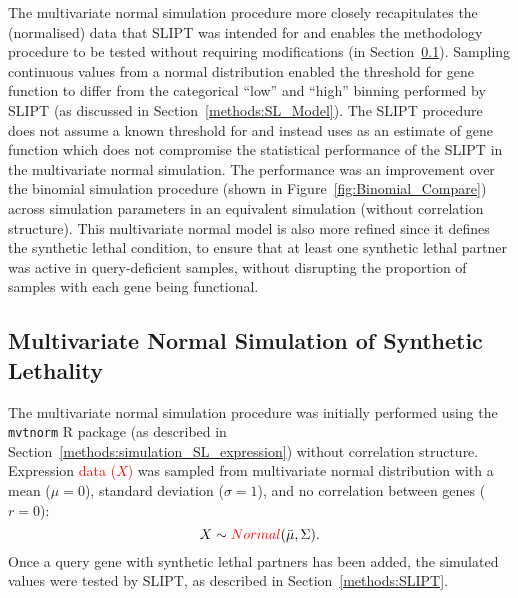 The multivariate normal simulation procedure more closely recapitulates the (normalised)  data that \gls{SLIPT} was intended for and enables the methodology procedure to be tested without requiring modifications (in Section~\ref{chapt2:simulation_mvtnorm}). Sampling continuous  values from a normal distribution enabled the  threshold for gene function to differ from the categorical ``low'' and ``high''  binning performed by \gls{SLIPT} (as discussed in Section~\ref{methods:SL_Model}). The \gls{SLIPT} procedure does not assume a known threshold for  and instead uses  as an estimate of gene function which does not compromise the statistical performance of the \gls{SLIPT} in the multivariate normal simulation. The performance was an improvement over the binomial simulation procedure (shown in Figure~\ref{fig:Binomial_Compare}) across simulation parameters in an equivalent simulation (without correlation structure). This multivariate normal model is also more refined since it defines the \gls{synthetic lethal} condition, to ensure that at least one \gls{synthetic lethal} partner was active in query-deficient samples, without disrupting the proportion of samples with each gene being functional.

\FloatBarrier

\subsection{Multivariate Normal Simulation of Synthetic Lethality} \label{chapt2:simulation_mvtnorm}

The multivariate normal simulation procedure was initially performed using the \texttt{mvtnorm} R package \citep{Genz2009, mvtnorm} (as described in Section~\ref{methods:simulation_SL_expression}) without correlation structure. Expression \textcolor{red}{data ($X$)} was sampled from multivariate normal distribution with a mean ($\mu = 0$), standard deviation ($\sigma = 1$), and no correlation between genes ($r = 0$): $$X\sim \textcolor{red}{Normal}(\bar{\mu},\Sigma).$$ Once a query gene with \gls{synthetic lethal} partners has been added, the simulated  values were tested by \gls{SLIPT}, as described in Section~\ref{methods:SLIPT}.

